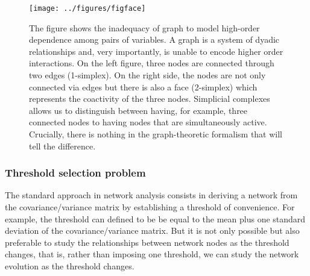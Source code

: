 \documentclass[onecollarge,runningheads]{svjour2}
\begin{document}
\begin{figure}[h]
        \centering
        \texttt{[image: ../figures/figface]}
        \caption{The figure shows the inadequacy of graph to model high-order dependence among pairs of variables. A graph is a system of dyadic relationships and, very importantly, is unable to encode higher order interactions. On the left figure, three nodes are connected through two edges (1-simplex). On the right side, the nodes are not only connected via edges but there is also a face (2-simplex) which represents the coactivity of the three nodes. Simplicial complexes allows us to distinguish between having, for example, three connected nodes to having nodes that are simultaneously active. Crucially, there is nothing in the graph-theoretic formalism that will tell the difference.}
\label{ex:dyadic}
\end{figure}

\subsubsection{Threshold selection problem}
\label{sse:thr}

The standard approach in network analysis consists in deriving a network from the covariance/variance matrix by establishing a threshold of convenience. For example, the threshold can defined to be be equal to the mean plus one standard deviation of the covariance/variance matrix. But it is not only possible but also preferable to study the relationships between network nodes as the threshold changes, that is, rather than imposing one threshold, we can study the network evolution as the threshold changes. 
\end{document}
